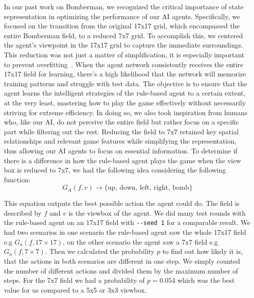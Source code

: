 In our past work on Bomberman, we recognized the critical importance of state representation in optimizing the performance 
of our AI agents. Specifically, we focused on the transition from the original 17x17 grid, which encompassed the entire Bomberman field, 
to a reduced 7x7 grid. To accomplish this, we centered the agent's viewpoint in the 17x17 grid to capture the immediate surroundings. 
This reduction was not just a matter of simplification, it is especially important to prevent overfitting~\cite{Art:Overfitting}. When the agent network consistently 
receives the entire 17x17 field for learning, there's a high likelihood that the network will memorize training patterns and struggle with test data. 
The objective is to ensure that the agent learns the intelligent strategies of the rule-based agent to a certain extent, at the very least, mastering how 
to play the game effectively without necessarily striving for extreme efficiency. In doing so, we also took inspiration from humans who, like our AI, do not perceive 
the entire field but rather focus on a specific part while filtering out the rest.
Reducing the field to 7x7 retained key spatial relationships 
and relevant game features while simplifying the representation, thus allowing our AI agents to focus on essential information.
To determine if there is a difference in how the rule-based agent plays the game when the view box is reduced to 7x7, we had the following idea considering the following function: 
\begin{equation} \label{eq:1}
G_A(f,v) \rightarrow \{\text{up, down, left, right, bomb}\}
\end{equation}

This equation outputs the best possible action the agent could do. The field is described by $f$ and $v$ is the viewbox of the agent. We did many 
test rounds with the rule-based agent on an 17x17 field with \verb|--seed 1| for a comparable result. We had two scenarios
in one scenario the rule-based agent saw the whole 17x17 field e.g $G_a(f, 17\times17)$, on the other scenario the agent saw a
7x7 field e.g $G_a(f, 7\times7)$. Then we calculated the probability $p$ to find out how likely it is, that the actions in both scenarios are different in one step.
We simply counted the number of different actions and divided them by the maximum number of steps.
For the 7x7 field we had a probability of $p=0.054$ which was the best value for us compared to a 5x5 or 3x3 viewbox.\\

